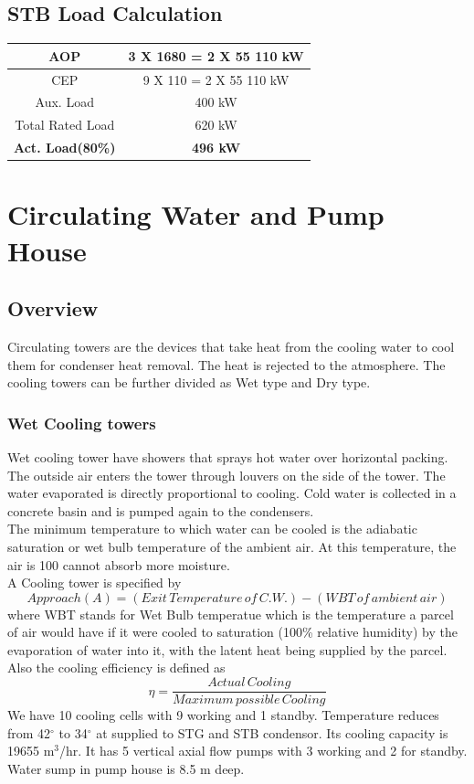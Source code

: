 \documentclass[english,11pt]{report}
\begin{document}
\section{STB Load Calculation}
\begin{center}
\begin{tabular}{|c|c|}
\hline
  AOP & 3 X 1680 = 2 X 55 110 kW \\ \hline
  CEP & 9 X 110 = 2 X 55 110 kW \\ \hline
  Aux. Load & 400 kW \\ \hline
  Total Rated Load & 620 kW \\ \hline
  \textbf{Act. Load(80\%)} & \textbf{496 kW}\\
  \hline
  
\end{tabular}
\end{center}

\chapter{Circulating Water and Pump House}
\section{Overview}
Circulating towers are the devices that take heat from the cooling water to cool them for condenser heat removal. The heat is rejected to the atmosphere. The cooling towers can be further divided as Wet type and Dry type.
\subsection{Wet Cooling towers}
Wet cooling tower have showers that sprays hot water over horizontal packing. The outside
air enters the tower through louvers on the side of the tower. The water evaporated is
directly proportional to cooling. Cold water is collected in a concrete basin and is pumped
again to the condensers.\\[1em]
The minimum temperature to which water can be cooled is the adiabatic saturation or wet
bulb temperature of the ambient air. At this temperature, the air is 100 %
cannot absorb more moisture.\\[1em]
A Cooling tower is specified by
$$Approach(A) = (Exit \,Temperature \,of \,C.W.) - (WBT \,of \,ambient \,air)$$
where WBT stands for Wet Bulb temperatue which is the temperature a parcel of air would have if it were cooled to saturation (100\% relative humidity) by the evaporation of water into it, with the latent heat being supplied by the parcel.\\[1em]
Also the cooling efficiency is defined as
$$\eta = \frac{Actual \,Cooling}{Maximum \,possible \,Cooling}$$
We have 10 cooling cells with 9 working and 1 standby. Temperature reduces from 42$^{\circ}$ to 34$^{\circ}$ at supplied to STG and STB condensor. Its cooling capacity is 19655 m$^3$/hr. It has 5 vertical axial flow pumps with 3 working and 2 for standby. Water sump in pump house is 8.5 m deep.
\end{document}

